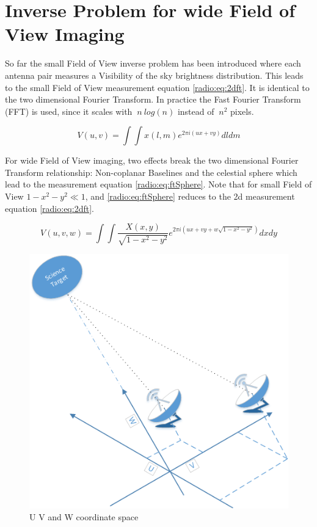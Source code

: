 \section{Inverse Problem for wide Field of View Imaging} \label{radio}
So far the small Field of View inverse problem has been introduced where each antenna pair measures a Visibility of the sky brightness distribution. This leads to the small Field of View measurement equation \eqref{radio:eq:2dft}. It is identical to the two dimensional Fourier Transform. In practice the Fast Fourier Transform (FFT) is used, since it scales with $~n\:log(n)$ instead of $~n^2$ pixels.

\begin{equation}\label{radio:eq:2dft}
V(u, v) = \int\int x(l, m) e^{2 \pi i (ux+vy)} dl dm
\end{equation}

For wide Field of View imaging, two effects break the two dimensional Fourier Transform relationship: Non-coplanar Baselines and the celestial sphere which lead to the measurement equation \eqref{radio:eq:ftSphere}. Note that for small Field of View $1 - x^2 -y ^2 \ll 1$, and \eqref{radio:eq:ftSphere} reduces to the 2d measurement equation \eqref{radio:eq:2dft}.

\begin{equation}\label{radio:eq:ftSphere}
	V(u, v, w) = \int\int \frac{X(x, y)}{\sqrt{1 - x^2 - y ^2}} e^{2 \pi i (ux+vy+ w\sqrt{1 - x^2 - y ^2})}dx dy
\end{equation}

\begin{figure}
	\centering
	\includegraphics[width=0.9\linewidth]{./chapters/03.radio/uvw.png}
	\caption{U V and W coordinate space}
	\label{radio:uvw}
	\vspace{-10pt}
\end{figure}


